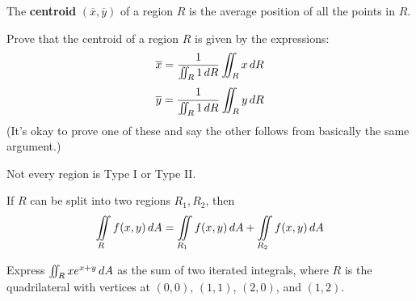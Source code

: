 \documentclass[letterpaper, twoside, 12pt]{book}
\begin{document}
          \begin{solution}

          \end{solution}

          \begin{contributors}

          \end{contributors}

\begin{definition}
  The \textbf{centroid} $(\overline{x},\overline{y})$ of a region $R$ is the
  average position of all the points in $R$.
\end{definition}

          \begin{problem}
            Prove that the centroid
            of a region $R$ is given by the expressions:
              \[
                \overline{x}
                  =
                \frac{
                  1
                }{
                  \iint_R 1\,d{R}
                }
                  \iint_R x\,d{R}
              \]
              \[
                \overline{y}
                  =
                \frac{
                  1
                }{
                  \iint_R 1\,d{R}
                }
                  \iint_R y\,d{R}
              \]
            (It's okay to prove one of these and say the other follows from
            basically the same argument.)
          \end{problem}

          \begin{solution}

          \end{solution}

          \begin{contributors}

          \end{contributors}

\begin{remark}
  Not every region is Type I or Type II.
\end{remark}

\begin{theorem}
  If $R$ can be split into two regions $R_1,R_2$, then
  \[
    \iint\limits_R f(x,y)\,d{A}
      =
    \iint\limits_{R_1} f(x,y)\,d{A} + \iint\limits_{R_2} f(x,y)\,d{A}
  \]
\end{theorem}

          \begin{problem}
            Express $\iint_R xe^{x+y}\,d{A}$ as the sum of two
            iterated integrals, where $R$ is the quadrilateral with
            vertices at $(0,0)$, $(1,1)$, $(2,0)$, and $(1,2)$.
          \end{problem}
\end{document}
